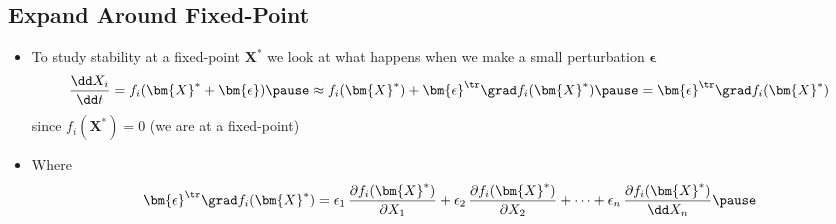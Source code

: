 
\begin{slide}
\section[-2]{Expand Around Fixed-Point}

\begin{PauseHighLight}
  \begin{itemize}
  \item To study stability at a fixed-point $\bm{X}^*$ we look at what
    happens when we make a small perturbation $\bm{\epsilon}$
    \begin{align*}
      \frac{\dd X_i}{\dd t} = f_i(\bm{X}^*+\bm{\epsilon})\pause
      \approx f_i(\bm{X}^*) + \bm{\epsilon}^\tr \grad f_i(\bm{X}^*)\pause
      = \bm{\epsilon}^\tr \grad f_i(\bm{X}^*)
    \end{align*}
    since $f_i(\bm{X}^*)=0$ (we are at a fixed-point)\pause
  \item Where
    \begin{align*}
      \bm{\epsilon}^\tr \grad f_i(\bm{X}^*) = \epsilon_1\,\frac{\partial
      f_i(\bm{X}^*)}{\partial X_1} +  \epsilon_2\,\frac{\partial
      f_i(\bm{X}^*)}{\partial X_2} + \cdots +  \epsilon_n\,\frac{\partial
      f_i(\bm{X}^*)}{\dd X_n}\pause
    \end{align*}
  \end{itemize}
\end{PauseHighLight}

\end{slide}

